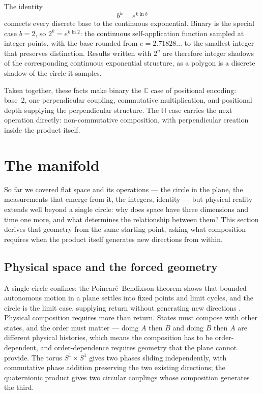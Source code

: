 \documentclass[12pt]{article}
\begin{document}
The identity
\[
    b^k = e^{k\ln b}
\]
connects every discrete base to the continuous exponential. Binary is the special case $b=2$, so $2^k=e^{k\ln 2}$: the continuous self-application function sampled at integer points, with the base rounded from $e=2.71828\ldots$ to the smallest integer that preserves distinction. Results written with $2^n$ are therefore integer shadows of the corresponding continuous exponential structure, as a polygon is a discrete shadow of the circle it samples.

Taken together, these facts make binary the $\mathbb{C}$ case of positional encoding: base~2, one perpendicular coupling, commutative multiplication, and positional depth supplying the perpendicular structure. The $\mathbb{H}$ case carries the next operation directly: non-commutative composition, with perpendicular creation inside the product itself.


\section{The manifold}

So far we covered flat space and its operations --- the circle in the plane, the measurements that emerge from it, the integers, identity --- but physical reality extends well beyond a single circle: why does space have three dimensions and time one more, and what determines the relationship between them? This section derives that geometry from the same starting point, asking what composition requires when the product itself generates new directions from within.

\subsection{Physical space and the forced geometry}

A single circle confines: the Poincar\'e--Bendixson theorem shows that bounded autonomous motion in a plane settles into fixed points and limit cycles, and the circle is the limit case, supplying return without generating new directions \cite{poincare,bendixson}. Physical composition requires more than return. States must compose with other states, and the order must matter --- doing $A$ then $B$ and doing $B$ then $A$ are different physical histories, which means the composition has to be order-dependent, and order-dependence requires geometry that the plane cannot provide. The torus $S^1 \times S^1$ gives two phases sliding independently, with commutative phase addition preserving the two existing directions; the quaternionic product gives two circular couplings whose composition generates the third.
\end{document}
